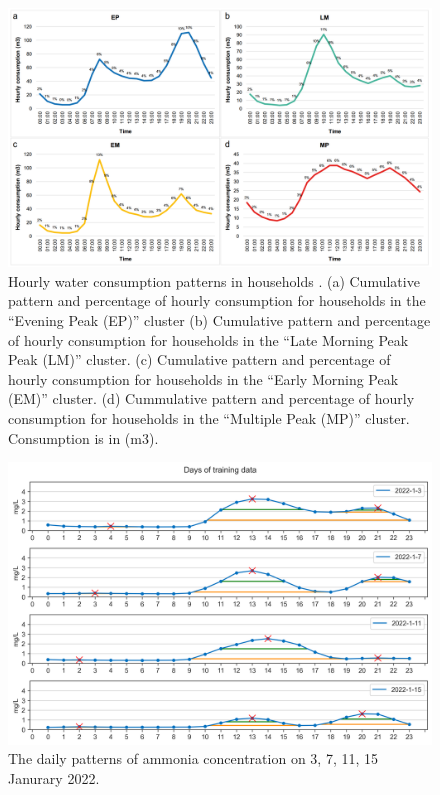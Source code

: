 \begin{figure}[h]
    \centering
    \includegraphics[width=0.8\columnwidth]{imgs/pre-processing/hourly-consumption-pattern.png}
    \caption{Hourly water consumption patterns in households \citep{abu-bakarQuantifyingImpactCOVID192021}. (a) Cumulative pattern and percentage of hourly consumption for households in the “Evening Peak (EP)” cluster (b) Cumulative pattern and percentage of hourly consumption for households in the “Late Morning Peak Peak (LM)” cluster. (c) Cumulative pattern and percentage of hourly consumption for households in the “Early Morning Peak (EM)” cluster. (d) Cummulative pattern and percentage of hourly consumption for households in the “Multiple Peak (MP)” cluster. Consumption is in (m3).}
    \label{fig:water-consumption-pattern}
 \end{figure}

\begin{figure}[h]
  \centering
  \includegraphics[width=0.6\columnwidth]{imgs/results/nh3-pattern.png}
  \caption{The daily patterns of ammonia concentration on 3, 7, 11, 15 Janurary 2022.}
  \label{fig:nh3-peak-pattern}
\end{figure}

